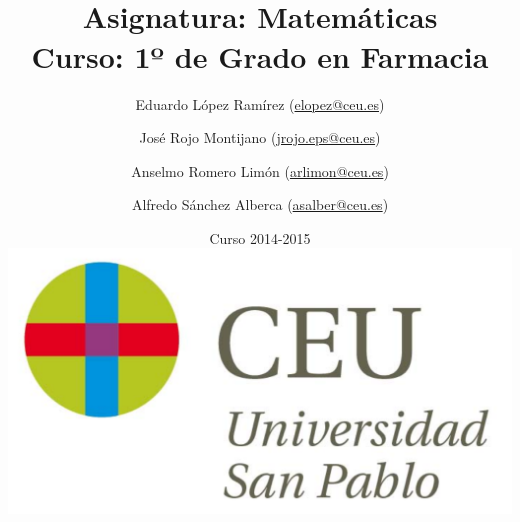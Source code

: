 \documentclass[a4paper,titlepage,dvips]{article}
\begin{document}
\sloppy

\title{\vskip 2cm
\shadowbox{\Huge \textbf{\textsf{\quad \textcolor[rgb]{0.00,0.00,0.50}{EJERCICIOS DE CÁLCULO}\quad}}}\\
   \vskip 1cm
   {\Large \textsf{\textcolor[rgb]{0.50,0.00,0.25}{Asignatura: Matemáticas }}}\\
   {\Large \textsf{\textcolor[rgb]{0.50,0.00,0.25}{Curso: 1º de Grado en Farmacia}}}
   }
\author{
   Eduardo López Ramírez (\url{elopez@ceu.es})
   \and
   José Rojo Montijano (\url{jrojo.eps@ceu.es})
   \and
   Anselmo Romero Limón (\url{arlimon@ceu.es})
   \and
   Alfredo Sánchez Alberca (\url{asalber@ceu.es})
}
\date{Curso 2014-2015\\[1cm]
\includegraphics[scale=0.3]{img/logo_uspceu_01}}

\maketitle
\tableofcontents
\newpage













%
%
%



%
\end{document}
